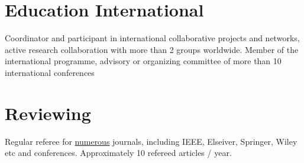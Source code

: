 \documentclass[margin,line,a4paper]{resume}
\begin{document}
\begin{resume}
\section{\mysidestyle Education International}
Coordinator and participant in international collaborative projects and networks, active research collaboration with more than 2 groups worldwide.
Member of the international programme, advisory or organizing committee of more than 10 international conferences
\section{\mysidestyle Reviewing}
Regular referee for \href{https://publons.com/author/1352342/shubhankar-majumdar}{numerous} journals, including IEEE, Elseiver, Springer, Wiley etc and conferences. Approximately 10 refereed articles / year. 

  	 


\end{resume}
\end{document}
